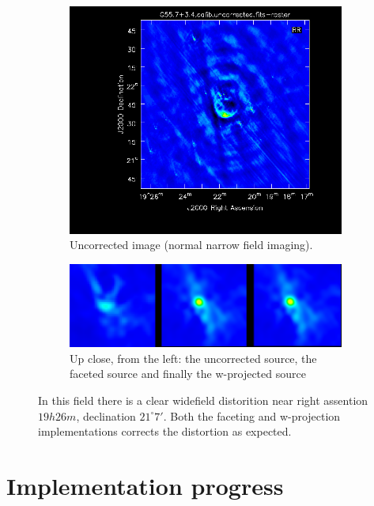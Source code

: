 \documentclass[a4paper,10pt]{article}
\begin{document}
\begin{figure}[h!]
\begin{subfigure}[b]{0.49\textwidth}
 \end{subfigure}
 \begin{subfigure}[b]{0.49\textwidth}
    \centering
    \includegraphics[width=\textwidth]{images/uncorrected.png}
    \caption{Uncorrected image (normal narrow field imaging).}
 \end{subfigure}
 \begin{subfigure}[b]{0.49\textwidth}
    \centering
    \includegraphics[width=\textwidth]{images/corrections.png}
    \caption{Up close, from the left: the uncorrected source, the faceted source and 
    finally the w-projected source}
 \end{subfigure}
 \caption[Supernova reminant G55.7+3.4]{In this field there is a clear widefield distorition near
 right assention $19h26m$, declination $21^\circ7'$. Both the faceting and w-projection
 implementations corrects the distortion as expected.}
 \label{FIG_SUPERNOVA}
\end{figure}
\section{Implementation progress}
\end{document}
